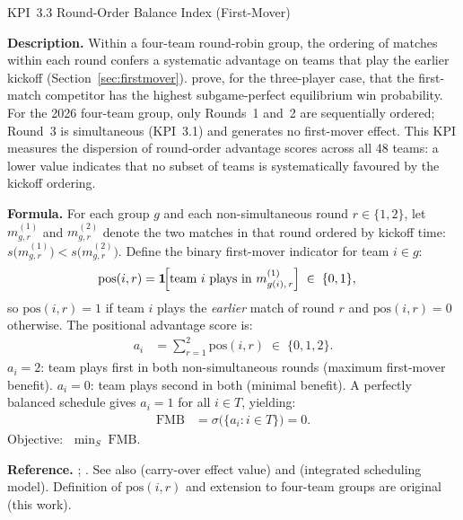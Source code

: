 \documentclass[12pt, letterpaper]{article}
\newcommand{\kpilabel}[1]{\noindent\textbf{#1}\enspace}
\begin{document}
\begin{kpibox}{KPI~3.3 \textendash{} Round-Order Balance Index (First-Mover)}

\kpilabel{Description.}
Within a four-team round-robin group, the ordering of matches within
each round confers a systematic advantage on teams that play the earlier
kickoff (Section~\ref{sec:firstmover}).  \citet{KrumerEtAl2017} prove,
for the three-player case, that the first-match competitor has the
highest subgame-perfect equilibrium win probability.  For the 2026
four-team group, only Rounds~1 and~2 are sequentially ordered; Round~3
is simultaneous (KPI~3.1) and generates no first-mover effect.  This
KPI measures the dispersion of round-order advantage scores across all
48 teams: a lower value indicates that no subset of teams is
systematically favoured by the kickoff ordering.

\medskip
\kpilabel{Formula.}
For each group $g$ and each non-simultaneous round $r \in \{1,2\}$,
let $m_{g,r}^{(1)}$ and $m_{g,r}^{(2)}$ denote the two matches in
that round ordered by kickoff time:
$s\!\bigl(m_{g,r}^{(1)}\bigr) < s\!\bigl(m_{g,r}^{(2)}\bigr)$.
Define the binary first-mover indicator for team $i \in g$:
\begin{align*}
  \mathrm{pos}(i,r) &= \mathbf{1}\!\Bigl[
    \text{team } i \text{ plays in }
    m_{g(i),\,r}^{(1)}\Bigr]
  \;\in\; \{0,1\},
\end{align*}
so $\mathrm{pos}(i,r)=1$ if team $i$ plays the \emph{earlier} match
of round $r$ and $\mathrm{pos}(i,r)=0$ otherwise.  The positional
advantage score is:
\begin{align*}
  a_i &= \sum_{r=1}^{2} \mathrm{pos}(i,r) \;\in\; \{0,1,2\}.
\end{align*}
$a_i = 2$: team plays first in both non-simultaneous rounds (maximum
first-mover benefit).  $a_i = 0$: team plays second in both (minimal
benefit).  A perfectly balanced schedule gives $a_i = 1$ for all
$i \in T$, yielding:
\begin{align*}
  \mathrm{FMB} &= \sigma\!\bigl(\{a_i : i \in T\}\bigr) = 0.
\end{align*}
Objective: $\;\displaystyle\min_{S}\;\mathrm{FMB}$.

\medskip
\kpilabel{Reference.}
\citet{KrumerEtAl2017}; \citet{CsatoEtAl2024}.  See also
\citet{Russell1980} (carry-over effect value) and
\citet{CavdarogluAtan2022} (integrated scheduling model).
Definition of $\mathrm{pos}(i,r)$ and extension to four-team groups
are original (this work).
\end{kpibox}
\end{document}
